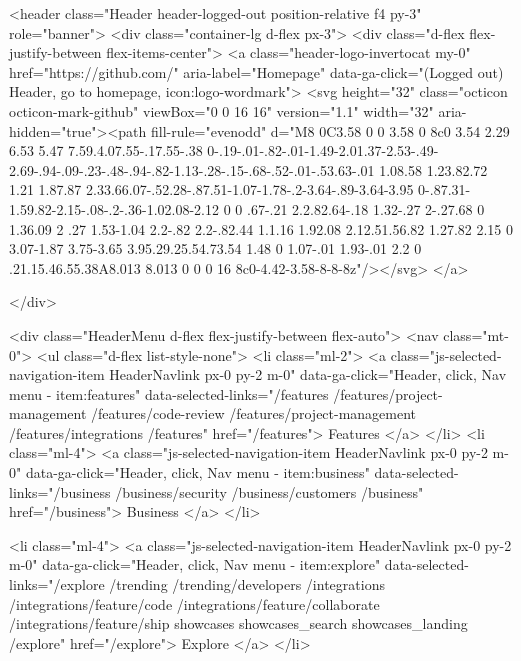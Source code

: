     



        
<header class="Header header-logged-out  position-relative f4 py-3" role="banner">
  <div class="container-lg d-flex px-3">
    <div class="d-flex flex-justify-between flex-items-center">
      <a class="header-logo-invertocat my-0" href="https://github.com/" aria-label="Homepage" data-ga-click="(Logged out) Header, go to homepage, icon:logo-wordmark">
        <svg height="32" class="octicon octicon-mark-github" viewBox="0 0 16 16" version="1.1" width="32" aria-hidden="true"><path fill-rule="evenodd" d="M8 0C3.58 0 0 3.58 0 8c0 3.54 2.29 6.53 5.47 7.59.4.07.55-.17.55-.38 0-.19-.01-.82-.01-1.49-2.01.37-2.53-.49-2.69-.94-.09-.23-.48-.94-.82-1.13-.28-.15-.68-.52-.01-.53.63-.01 1.08.58 1.23.82.72 1.21 1.87.87 2.33.66.07-.52.28-.87.51-1.07-1.78-.2-3.64-.89-3.64-3.95 0-.87.31-1.59.82-2.15-.08-.2-.36-1.02.08-2.12 0 0 .67-.21 2.2.82.64-.18 1.32-.27 2-.27.68 0 1.36.09 2 .27 1.53-1.04 2.2-.82 2.2-.82.44 1.1.16 1.92.08 2.12.51.56.82 1.27.82 2.15 0 3.07-1.87 3.75-3.65 3.95.29.25.54.73.54 1.48 0 1.07-.01 1.93-.01 2.2 0 .21.15.46.55.38A8.013 8.013 0 0 0 16 8c0-4.42-3.58-8-8-8z"/></svg>
      </a>

    </div>

    <div class="HeaderMenu d-flex flex-justify-between flex-auto">
        <nav class="mt-0">
          <ul class="d-flex list-style-none">
              <li class="ml-2">
                <a class="js-selected-navigation-item HeaderNavlink px-0 py-2 m-0" data-ga-click="Header, click, Nav menu - item:features" data-selected-links="/features /features/project-management /features/code-review /features/project-management /features/integrations /features" href="/features">
                  Features
</a>              </li>
              <li class="ml-4">
                <a class="js-selected-navigation-item HeaderNavlink px-0 py-2 m-0" data-ga-click="Header, click, Nav menu - item:business" data-selected-links="/business /business/security /business/customers /business" href="/business">
                  Business
</a>              </li>

              <li class="ml-4">
                <a class="js-selected-navigation-item HeaderNavlink px-0 py-2 m-0" data-ga-click="Header, click, Nav menu - item:explore" data-selected-links="/explore /trending /trending/developers /integrations /integrations/feature/code /integrations/feature/collaborate /integrations/feature/ship showcases showcases_search showcases_landing /explore" href="/explore">
                  Explore
</a>              </li>

